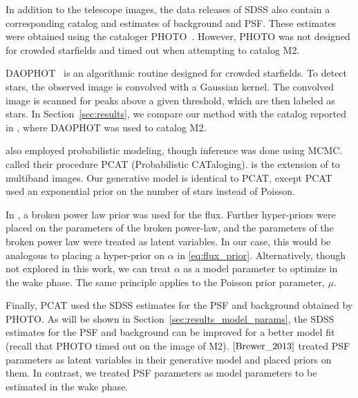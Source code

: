 In addition to the telescope images, the data releases of SDSS also contain 
a corresponding catalog and estimates of background and PSF. These estimates were obtained using the cataloger PHOTO~\cite{lupton2001sdss}. However, PHOTO was not designed for crowded starfields and timed out when attempting to catalog M2. 

DAOPHOT~\cite{stetson2987daophot} is an algorithmic routine designed for crowded starfields. To detect stars, the observed image is convolved with a Gaussian kernel. The convolved image is scanned for peaks above a given threshold, which are then labeled as stars. In Section~\ref{sec:results}, we compare our method with the catalog reported in \cite{An_2008_m2}, where DAOPHOT was used to catalog M2. 

\cite{Brewer_2013, Portillo_2017, Feder_2019} also employed probabilistic modeling, though inference was done using MCMC. \cite{Portillo_2017, Feder_2019} called their procedure PCAT (Probabilistic CATaloging). \cite{Feder_2019} is the extension 
of \cite{Portillo_2017} to multiband images. Our generative model is identical to PCAT, except PCAT used an exponential prior on the number of stars instead of Poisson. 

In \cite{Brewer_2013}, a broken power law prior was used for the flux. 
Further hyper-priors were placed on the parameters of the broken power-law, and the parameters of the broken power law were treated as latent variables. In our case, this would be analogous to placing a hyper-prior on $\alpha$ in \eqref{eq:flux_prior}. Alternatively, though not explored in this work, we can treat $\alpha$ as a model parameter to optimize in the wake phase. The same principle applies to the Poisson prior parameter, $\mu$. 

Finally, PCAT used the SDSS estimates for the PSF and background obtained by PHOTO.
As will be shown in Section~\ref{sec:results_model_params}, the SDSS estimates for the PSF and background can be improved for a better model fit (recall that PHOTO timed out 
on the image of M2). $\cite{Brewer_2013}$ treated PSF parameters as latent variables in their generative model and placed priors on them. In contrast, we treated PSF parameters as model parameters to be estimated in the wake phase. 

